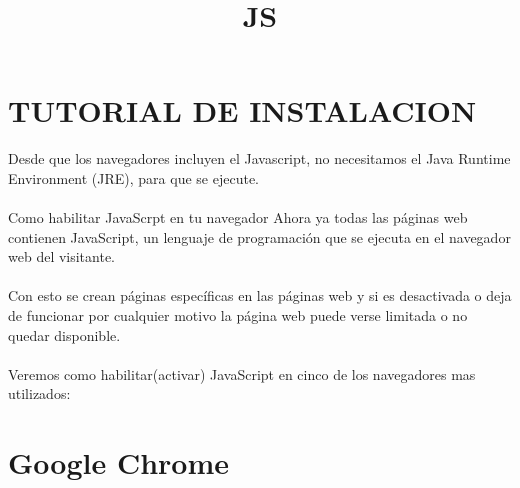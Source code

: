 \documentclass[11pt]{article} %
\title{JS}
\begin{document}
\maketitle

\section{TUTORIAL DE INSTALACION}
 Desde que los navegadores incluyen el Javascript, no necesitamos el Java Runtime Environment (JRE), para que se ejecute.
\\  \\
Como habilitar JavaScrpt en tu navegador 
Ahora ya todas las páginas web contienen  JavaScript, un lenguaje de programación que se ejecuta en el navegador web del visitante. \\\\
Con esto se crean páginas específicas en las páginas web y si es desactivada o deja de funcionar por cualquier motivo la página web puede verse limitada o no quedar disponible.
\\\\
Veremos como habilitar(activar) JavaScript en cinco de los navegadores mas utilizados:

\section{Google Chrome}
\end{document}
